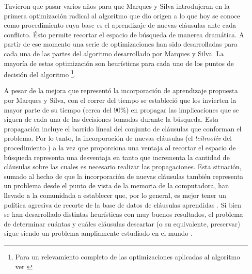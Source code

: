 Tuvieron que pasar varios años para que Marques y Silva introdujeran en
\cite{marques-silva:iccad96} la primera optimización radical al algoritmo \dpll
que dio origen a lo que hoy se conoce como procedimiento \cdcl cuya base es el
aprendizaje de nuevas cláusulas ante cada conflicto. Ésto permite recortar el
espacio de búsqueda de manerea dramática. A partir de ese momento una serie de
optimizaciones han sido desarrolladas para cada una de las partes del algoritmo
desarrollado por Marques y Silva. La mayoría de estas optimización
 son heurísticas para cada uno de los puntos de decisión
del algoritmo \footnote{Para un relevamiento completo de las optimizaciones
aplicadas al algoritmo \cdcl ver \cite{manthey:mathesis}}.

A pesar de la mejora que representó la incorporación de aprendizaje propuesta
por Marques y Silva, con el correr del tiempo se estableció que los \ssolvers
invierten la mayor parte de su tiempo (cerca del $90\%$) en propagar las
implicaciones que se siguen de cada una de las decisiones tomadas durante la
búsqueda. Esta propagación incluye el barrido líneal  del conjunto de cláusulas que conforman el problema. Por lo tanto,
la incorporación de nuevas cláusulas (el \emph{leitmotiv} del procedimiento
\cdcl) a la vez que proporciona una ventaja al recortar el espacio de búsqueda
representa una desventaja en tanto que incrementa la cantidad de cláusulas sobre
las cuales es necesario realizar las propagaciones. Esta situación, sumado al
hecho de que la incorporación de nuevas cláusulas también representa un problema
desde el punto de vista de la memoria de la computadora, han llevado a la
comunidada a establecer que, por lo general, es mejor tener un política agresiva
de recorte de la base de datos de cláusulas aprendidas
\cite{Audemard:2009:PLC:1661445.1661509}. Si bien se han desarrollado distintas
heurísticas con muy buenos resultados, el problema de determinar cuántas y
cuáles cláusulas descartar (o su equivalente, preservar) sigue siendo un
problema ampliamente estudiado en el mundo \sat.



